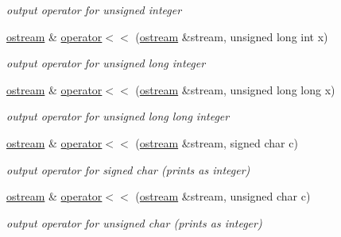 \begin{DoxyCompactItemize}
\begin{DoxyCompactList}\small\item\em output operator for unsigned integer \end{DoxyCompactList}\item 
\hyperlink{classhwlib_1_1ostream}{ostream} \& \hyperlink{classhwlib_1_1ostream_a7df95ef6e7402e0238681b5a0ee1a4f6}{operator$<$$<$} (\hyperlink{classhwlib_1_1ostream}{ostream} \&stream, unsigned long int x)\hypertarget{classhwlib_1_1ostream_a7df95ef6e7402e0238681b5a0ee1a4f6}{}\label{classhwlib_1_1ostream_a7df95ef6e7402e0238681b5a0ee1a4f6}

\begin{DoxyCompactList}\small\item\em output operator for unsigned long integer \end{DoxyCompactList}\item 
\hyperlink{classhwlib_1_1ostream}{ostream} \& \hyperlink{classhwlib_1_1ostream_a7ab00ab622e0e7c42198f34597713390}{operator$<$$<$} (\hyperlink{classhwlib_1_1ostream}{ostream} \&stream, unsigned long long x)\hypertarget{classhwlib_1_1ostream_a7ab00ab622e0e7c42198f34597713390}{}\label{classhwlib_1_1ostream_a7ab00ab622e0e7c42198f34597713390}

\begin{DoxyCompactList}\small\item\em output operator for unsigned long long integer \end{DoxyCompactList}\item 
\hyperlink{classhwlib_1_1ostream}{ostream} \& \hyperlink{classhwlib_1_1ostream_a62d3d656e6a5021fc4a6aa6940b5641e}{operator$<$$<$} (\hyperlink{classhwlib_1_1ostream}{ostream} \&stream, signed char c)\hypertarget{classhwlib_1_1ostream_a62d3d656e6a5021fc4a6aa6940b5641e}{}\label{classhwlib_1_1ostream_a62d3d656e6a5021fc4a6aa6940b5641e}

\begin{DoxyCompactList}\small\item\em output operator for signed char (prints as integer) \end{DoxyCompactList}\item 
\hyperlink{classhwlib_1_1ostream}{ostream} \& \hyperlink{classhwlib_1_1ostream_a3fea1f54c018fe926d9c7ee25ebd917a}{operator$<$$<$} (\hyperlink{classhwlib_1_1ostream}{ostream} \&stream, unsigned char c)\hypertarget{classhwlib_1_1ostream_a3fea1f54c018fe926d9c7ee25ebd917a}{}\label{classhwlib_1_1ostream_a3fea1f54c018fe926d9c7ee25ebd917a}

\begin{DoxyCompactList}\small\item\em output operator for unsigned char (prints as integer) \end{DoxyCompactList}\end{DoxyCompactItemize}
